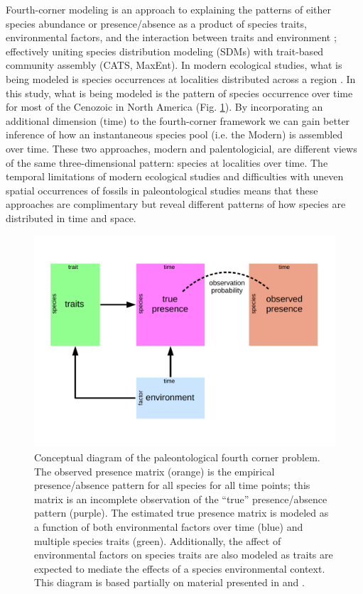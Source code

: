 \documentclass[12pt,letterpaper]{article}
\begin{document}
Fourth-corner modeling is an approach to explaining the patterns of either species abundance or presence/absence as a product of species traits, environmental factors, and the interaction between traits and environment \citep{Brown2014c,Warton2015a,Pollock2012,Jamil2013}; effectively uniting species distribution modeling (SDMs) with trait-based community assembly (CATS, MaxEnt). In modern ecological studies, what is being modeled is species occurrences at localities distributed across a region \citep{Pollock2012,Jamil2013}. In this study, what is being modeled is the pattern of species occurrence over time for most of the Cenozoic in North America (Fig. \ref{fig:concept_fourth_corner}). By incorporating an additional dimension (time) to the fourth-corner framework we can gain better inference of how an instantaneous species pool (i.e. the Modern) is assembled over time. These two approaches, modern and palentologicial, are different views of the same three-dimensional pattern: species at localities over time. The temporal limitations of modern ecological studies and difficulties with uneven spatial occurrences of fossils in paleontological studies means that these approaches are complimentary but reveal different patterns of how species are distributed in time and space.

\begin{figure}[ht]
  \centering
  \includegraphics[width=\textwidth,height=0.4\textheight,keepaspectratio=true]{figure/paleo_fourth_corner}
  \caption[Conceptual diagram of the paleontological fourth-courner problem]{Conceptual diagram of the paleontological fourth corner problem. The observed presence matrix (orange) is the empirical presence/absence pattern for all species for all time points; this matrix is an incomplete observation of the ``true'' presence/absence pattern (purple). The estimated true presence matrix is modeled as a function of both environmental factors over time (blue) and multiple species traits (green). Additionally, the affect of environmental factors on species traits are also modeled as traits are expected to mediate the effects of a species environmental context. This diagram is based partially on material presented in \citet{Brown2014c} and \citet{Warton2015a}.}
  \label{fig:concept_fourth_corner}
\end{figure}
\end{document}
